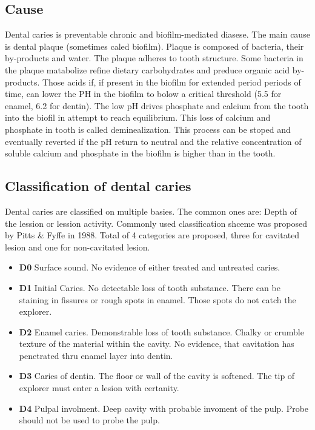 \subsection{Cause}
Dental caries is preventable chronic and biofilm-mediated diasese. The main cause is dental plaque (sometimes caled biofilm). Plaque is composed of bacteria, their by-products and water. The plaque adheres to tooth structure. Some bacteria in the plaque matabolize refine dietary carbohydrates and preduce organic acid by-products. Those acids if, if present in the biofilm for extended period periods of time, can lower the PH in the biofilm to bolow a critical threshold (5.5 for enamel, 6.2 for dentin). The low pH drives phosphate and calcium from the tooth into the biofil in attempt to reach equilibrium. This loss of calcium and phosphate in tooth is called deminealization. This process can be stoped and eventually reverted if the pH return to neutral and the relative concentration of soluble calcium and phosphate in the biofilm is higher than in the tooth.


\subsection{Classification of dental caries}
Dental caries are classified on multiple basies. The common ones are: Depth of the lession or lession activity. \newline
Commonly used classification shceme was proposed by Pitts \& Fyffe in 1988. Total of 4 categories are proposed, three for cavitated lesion and one for non-cavitated lesion.
\begin{itemize}
    \item \textbf{D0} Surface sound. No evidence of either treated and untreated caries.
    \item \textbf{D1} Initial Caries. No detectable loss of tooth substance. There can be staining in fissures or rough spots in enamel. Those spots do not catch the explorer.
    \item \textbf{D2} Enamel caries. Demonstrable loss of tooth substance. Chalky or crumble texture of the material within the cavity. No evidence, that cavitation has penetrated thru enamel layer into dentin.
    \item \textbf{D3} Caries of dentin. The floor or wall of the cavity is softened. The tip of explorer must enter a lesion with certanity.
    \item \textbf{D4} Pulpal involment. Deep cavity with probable invoment of the pulp. Probe should not be used to probe the pulp.
\end{itemize}

